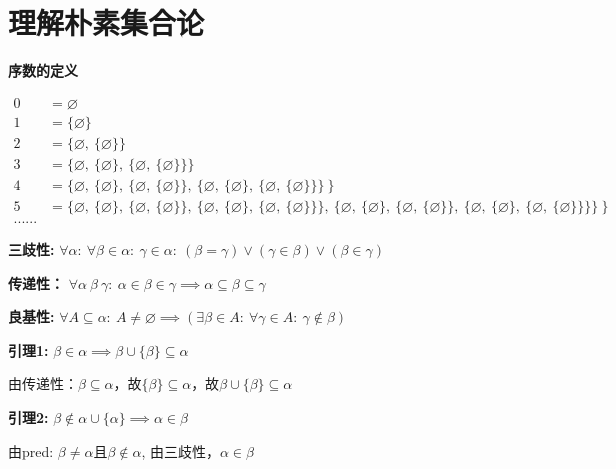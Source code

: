 \documentclass[UTF8, 9pt, a4paper]{ctexart}
\newcommand{\ksec}[2]{\noindent \textbf{\large #1} #2\par}
\begin{document}
	
	\section{理解朴素集合论}	
	
	\ksec{序数的定义}{}
	
	$ \begin{array}{ll}
	 0 &= \varnothing \\
	 1 &= \{ \varnothing \}\\
	 2 &= \{ \varnothing,\ \{\varnothing\} \}\\
	 3 &= \{ \varnothing,\ \{\varnothing\},\ \{ \varnothing,\ \{\varnothing\} \} \}\\
	 4 &= \{ \varnothing,\ \{\varnothing\},\ \{ \varnothing,\ \{\varnothing\} \}, \ \{ \varnothing,\ \{\varnothing\},\ \{ \varnothing,\ \{\varnothing\} \} \}\ \}\\
	 5 &= \{ \varnothing,\ \{\varnothing\},\ \{ \varnothing,\ \{\varnothing\} \}, \ \{ \varnothing,\ \{\varnothing\},\ \{ \varnothing,\ \{\varnothing\} \} \},\ \{ \varnothing,\ \{\varnothing\},\ \{ \varnothing,\ \{\varnothing\} \}, \ \{ \varnothing,\ \{\varnothing\},\ \{ \varnothing,\ \{\varnothing\} \} \}\}\ \}\\
	 ......
	\end{array} $
	
	\vspace{0.5cm}
	
	\ksec{三歧性: }{$\forall \alpha:\  \forall \beta \in \alpha:\ \gamma \in \alpha :\ (\beta = \gamma) \lor (\gamma \in \beta) \lor (\beta \in \gamma)$}
	
	\ksec{传递性：}{$ \forall \alpha\ \beta\ \gamma:\ \alpha \in \beta \in \gamma \implies \alpha \subseteq \beta \subseteq \gamma $}
	
	\ksec{良基性: }{$ \forall A \subseteq \alpha:\ A \neq \varnothing \implies (\exists \beta \in A:\ \forall \gamma \in A:\ \gamma \notin \beta) $}
	
	\vspace{0.5cm}
	
	
	\ksec{引理1: }{$ \beta \in \alpha \implies \beta \cup \{ \beta \} \subseteq \alpha $}
	由传递性：$\beta \subseteq \alpha $，故$ \{\beta\} \subseteq \alpha $，故$ \beta\cup \{\beta\} \subseteq \alpha $
	
	\vspace{0.5cm}
	
	\ksec{引理2: }{$ \beta \notin \alpha\cup\{\alpha\} \implies \alpha \in \beta $}
	由pred: $ \beta \neq \alpha  $且$ \beta \notin \alpha $, 由三歧性，$ \alpha \in \beta $
	
\end{document}
